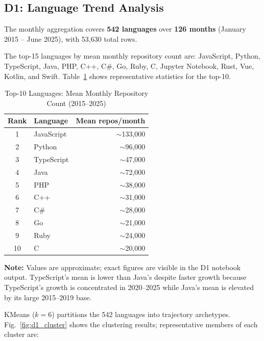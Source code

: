 \documentclass[conference]{IEEEtran}
\begin{document}
\subsection{D1: Language Trend Analysis}

The monthly aggregation covers \textbf{542 languages} over
\textbf{126 months} (January 2015 -- June 2025), with 53,630 total rows.

The top-15 languages by mean monthly repository count are: JavaScript,
Python, TypeScript, Java, PHP, C++, C\#, Go, Ruby, C, Jupyter Notebook,
Rust, Vue, Kotlin, and Swift. Table~\ref{tab:top10} shows representative
statistics for the top-10.

\begin{table}[h]
\caption{Top-10 Languages: Mean Monthly Repository Count (2015--2025)}
\label{tab:top10}
\centering
\begin{tabular}{clr}
\toprule
\textbf{Rank} & \textbf{Language} & \textbf{Mean repos/month} \\
\midrule
1  & JavaScript      & $\sim$133,000 \\
2  & Python          & $\sim$96,000  \\
3  & TypeScript      & $\sim$47,000  \\
4  & Java            & $\sim$72,000  \\
5  & PHP             & $\sim$38,000  \\
6  & C++             & $\sim$31,000  \\
7  & C\#             & $\sim$28,000  \\
8  & Go              & $\sim$21,000  \\
9  & Ruby            & $\sim$24,000  \\
10 & C               & $\sim$20,000  \\
\bottomrule
\end{tabular}
\end{table}

\textbf{Note:} Values are approximate; exact figures are visible in the D1
notebook output. TypeScript's mean is lower than Java's despite faster
growth because TypeScript's growth is concentrated in 2020--2025 while
Java's mean is elevated by its large 2015--2019 base.

KMeans ($k=6$) partitions the 542 languages into trajectory archetypes.
Fig.~\ref{fig:d1_cluster} shows the clustering results; representative
members of each cluster are:
\end{document}

